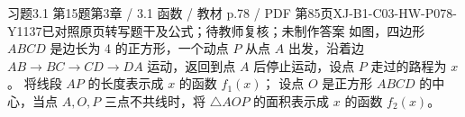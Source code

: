 \par\noindent\begin{minipage}{\linewidth}
\begin{bankitem}{习题3.1 第15题}{第3章 / 3.1 函数 / 教材 p.78 / PDF 第85页}{XJ-B1-C03-HW-P078-Y1137}{已对照原页转写题干及公式；待教师复核；未制作答案}
如图，四边形 $ABCD$ 是边长为 4 的正方形，一个动点 $P$ 从点 $A$ 出发，沿着边 $AB\to BC\to CD\to DA$ 运动，返回到点 $A$ 后停止运动，设点 $P$ 走过的路程为 $x$。
将线段 $AP$ 的长度表示成 $x$ 的函数 $f_1(x)$；
设点 $O$ 是正方形 $ABCD$ 的中心，当点 $A,O,P$ 三点不共线时，将 $\triangle AOP$ 的面积表示成 $x$ 的函数 $f_2(x)$。
\end{bankitem}
\end{minipage}\par\medskip
